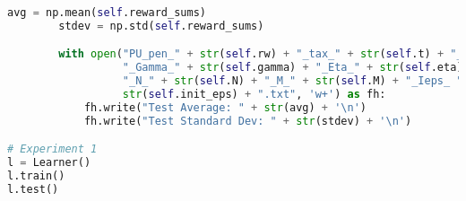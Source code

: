 \documentclass[12pt,a4paper]{article}
\begin{document}
\begin{lstlisting}[language=Python,numbers=none,basicstyle=\tiny]
        avg = np.mean(self.reward_sums)
        stdev = np.std(self.reward_sums)

        with open("PU_pen_" + str(self.rw) + "_tax_" + str(self.t) + "_epsdec_" + str(self.eps_dec) +
                  "_Gamma_" + str(self.gamma) + "_Eta_" + str(self.eta) +
                  "_N_" + str(self.N) + "_M_" + str(self.M) + "_Ieps_ " +
                  str(self.init_eps) + ".txt", 'w+') as fh:
            fh.write("Test Average: " + str(avg) + '\n')
            fh.write("Test Standard Dev: " + str(stdev) + '\n')

# Experiment 1
l = Learner()
l.train()
l.test()
	\end{lstlisting}

	
            
            
\end{document}
